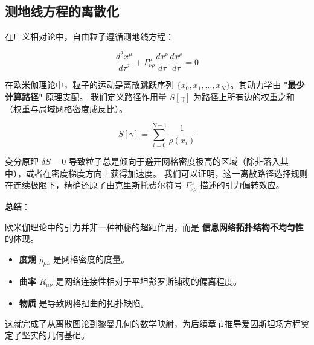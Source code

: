 \subsection{测地线方程的离散化}

在广义相对论中，自由粒子遵循测地线方程：

\[\frac{d^2 x^\mu}{d\tau^2} + \Gamma^\mu_{\nu\rho} \frac{dx^\nu}{d\tau} \frac{dx^\rho}{d\tau} = 0\]

在欧米伽理论中，粒子的运动是离散跳跃序列 $\{x_0, x_1, \dots, x_N\}$。其动力学由 \textbf{"最少计算路径"} 原理支配。
我们定义路径作用量 $S[\gamma]$ 为路径上所有边的权重之和（权重与局域网格密度成反比）。

\[S[\gamma] = \sum_{i=0}^{N-1} \frac{1}{\rho(x_i)}\]

变分原理 $\delta S = 0$ 导致粒子总是倾向于避开网格密度极高的区域（除非落入其中），或者在密度梯度方向上获得加速度。
我们可以证明，这一离散路径选择规则在连续极限下，精确还原了由克里斯托费尔符号 $\Gamma^\mu_{\nu\rho}$ 描述的引力偏转效应。

\textbf{总结}：

欧米伽理论中的引力并非一种神秘的超距作用，而是 \textbf{信息网络拓扑结构不均匀性} 的体现。

\begin{itemize}
\item \textbf{度规 $g_{\mu\nu}$} 是网格密度的度量。
\item \textbf{曲率 $R_{\mu\nu}$} 是网络连接性相对于平坦彭罗斯铺砌的偏离程度。
\item \textbf{物质} 是导致网格扭曲的拓扑缺陷。
\end{itemize}

这就完成了从离散图论到黎曼几何的数学映射，为后续章节推导爱因斯坦场方程奠定了坚实的几何基础。
